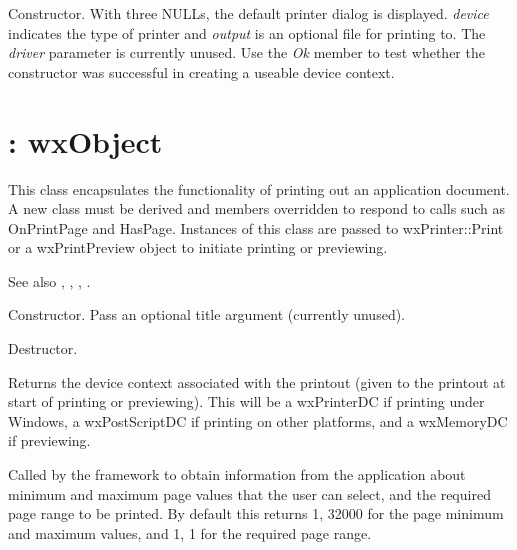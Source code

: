 Constructor.  With three NULLs, the default printer dialog is
displayed. {\it device} indicates the type of printer and {\it output}
is an optional file for printing to. The {\it driver} parameter is
currently unused.  Use the {\it Ok} member to test whether the
constructor was successful in creating a useable device context.

\section{: wxObject}\label{wxprintout}


This class encapsulates the functionality of printing out an
application document. A new class must be derived and members
overridden to respond to calls such as OnPrintPage and HasPage.
Instances of this class are passed to wxPrinter::Print or a
wxPrintPreview object to initiate printing or previewing.

See also , ,\rtfsp
{}, .



Constructor. Pass an optional title argument (currently unused).



Destructor.



Returns the device context associated with the printout (given to the printout at start of
printing or previewing). This will be a wxPrinterDC if printing under Windows,
a wxPostScriptDC if printing on other platforms, and a wxMemoryDC if previewing.



Called by the framework to obtain information from the application about minimum and maximum page values that
the user can select, and the required page range to be printed. By default this
returns 1, 32000 for the page minimum and maximum values, and 1, 1 for the required page range.

